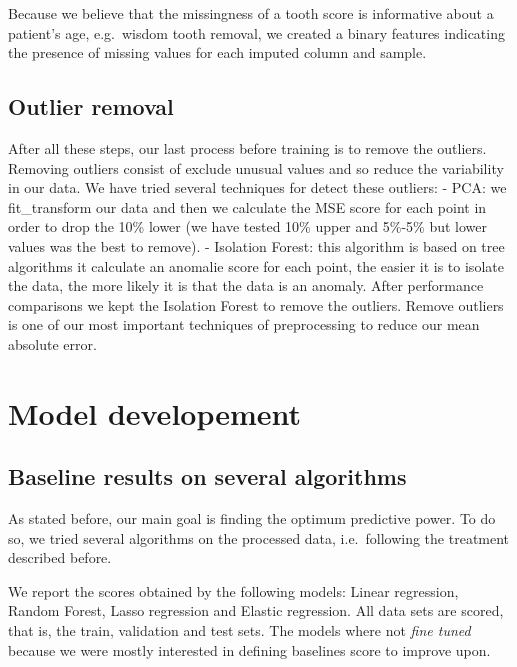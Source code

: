 \documentclass[11pt,]{article}
\begin{document}
Because we believe that the missingness of a tooth score is informative
about a patient's age, e.g.~wisdom tooth removal, we created a binary
features indicating the presence of missing values for each imputed
column and sample.

\hypertarget{outlier-removal}{%
\subsection{Outlier removal}\label{outlier-removal}}

After all these steps, our last process before training is to remove the
outliers. Removing outliers consist of exclude unusual values and so
reduce the variability in our data. We have tried several techniques for
detect these outliers: - PCA: we fit\_transform our data and then we
calculate the MSE score for each point in order to drop the 10\% lower
(we have tested 10\% upper and 5\%-5\% but lower values was the best to
remove). - Isolation Forest: this algorithm is based on tree algorithms
it calculate an anomalie score for each point, the easier it is to
isolate the data, the more likely it is that the data is an anomaly.
After performance comparisons we kept the Isolation Forest to remove the
outliers. Remove outliers is one of our most important techniques of
preprocessing to reduce our mean absolute error.

\hypertarget{model-developement}{%
\section{Model developement}\label{model-developement}}

\hypertarget{baseline-results-on-several-algorithms}{%
\subsection{Baseline results on several
algorithms}\label{baseline-results-on-several-algorithms}}

As stated before, our main goal is finding the optimum predictive power.
To do so, we tried several algorithms on the processed data,
i.e.~following the treatment described before.

We report the scores obtained by the following models: Linear
regression, Random Forest, Lasso regression and Elastic regression. All
data sets are scored, that is, the train, validation and test sets. The
models where not \emph{fine tuned} because we were mostly interested in
defining baselines score to improve upon.
\end{document}
